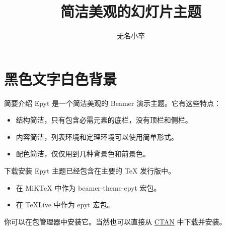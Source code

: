 \documentclass[14pt,notheorems,xcolor={rgb}]{beamer}
\newcommand{\mylead}[1]{\textcolor{accent1}{#1}}
\newcommand{\mybold}[1]{\textcolor{accent2}{#1}}
\newcommand{\mywarn}[1]{\textcolor{accent3}{#1}}
\begin{document}
\title{简洁美观的幻灯片主题}
\author{无名小卒}

\begin{frame}[plain]\transboxout
\titlepage
\end{frame}


\section{黑色文字白色背景}

\begin{frame}{简要介绍}
\mylead{Epyt} 是一个简洁美观的 Beamer 演示主题。它有这些特点：\pause
\begin{itemize}[<+->]
\item 结构简洁，只有包含必需元素的底栏，没有顶栏和侧栏。
\item 内容简洁，列表环境和定理环境可以使用简单形式。
\item 配色简洁，仅仅用到几种背景色和前景色。
\end{itemize}
\end{frame}

\begin{frame}{下载安装}
\mylead{Epyt} 主题已经包含在主要的 TeX 发行版中。
\begin{itemize}
  \item 在 MiKTeX 中作为 \mybold{beamer-theme-epyt} 宏包。
  \item 在 TeXLive 中作为 \mybold{epyt} 宏包。
\end{itemize}
你可以在包管理器中安装它。当然也可以直接从
\href{https://www.ctan.org/pkg/epyt}{CTAN} 中下载并安装。
\end{frame}

\end{document}
